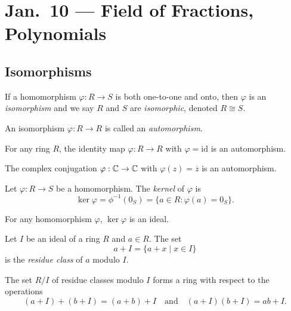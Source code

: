 \chapter{Jan.~10 --- Field of Fractions, Polynomials}

\section{Isomorphisms}
\begin{definition}[Isomorphism]
If a homomorphism $\varphi : R \to S$ is both one-to-one
and onto,
then $\varphi$ is an \emph{isomorphism} and we say $R$
and $S$ are \emph{isomorphic}, denoted
$R \cong S$.
\end{definition}

\begin{definition}[Automorphism]
  An isomorphism $\varphi : R \to R$ is called an
  \emph{automorphism}.
\end{definition}

\begin{example}
  For any ring $R$, the identity map $\varphi : R \to R$
  with $\varphi = \text{id}$ is an automorphism.
\end{example}

\begin{exercise}
  The complex conjugation $\varphi : \mathbb{C} \to \mathbb{C}$
  with $\varphi(z) = \overline{z}$ is an automorphism.
\end{exercise}

\begin{definition}[Kernel]
  Let $\varphi : R \to S$ be a homomorphism. The
  \emph{kernel} of $\varphi$ is
  \[
    \ker \varphi = \phi^{-1}(0_S) = \{ a \in R : \varphi(a) = 0_S \}.
  \]
\end{definition}

\begin{exercise}
  For any homomorphism $\varphi$, $\ker \varphi$ is
  an ideal.
\end{exercise}

\begin{definition}
  Let $I$ be an ideal of a ring $R$ and $a \in R$.
  The set
  \[a + I = \{a + x \mid x \in I\}\]
  is the \emph{residue class} of $a$ modulo $I$.
\end{definition}

\begin{exercise}
  The set $R / I$ of residue classes modulo $I$ forms
  a ring with respect to the operations
  \[(a + I) + (b + I) = (a + b) + I \quad \text{and} \quad (a + I)(b + I) = ab + I.\]
\end{exercise}

